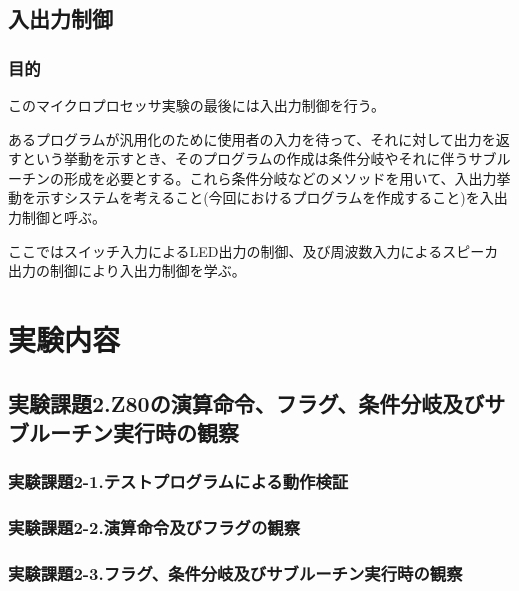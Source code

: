 \documentclass[11pt,a4j]{jsarticle}
\begin{document}
   
  \subsection{入出力制御}
   
   \subsubsection{目的}
   このマイクロプロセッサ実験の最後には入出力制御を行う。
   
   あるプログラムが汎用化のために使用者の入力を待って、それに対して出力を返すという挙動を示すとき、そのプログラムの作成は条件分岐やそれに伴うサブルーチンの形成を必要とする。これら条件分岐などのメソッドを用いて、入出力挙動を示すシステムを考えること(今回におけるプログラムを作成すること)を入出力制御と呼ぶ。
   
   ここではスイッチ入力によるLED出力の制御、及び周波数入力によるスピーカ出力の制御により入出力制御を学ぶ。
   
   \subsubsection{}
  
  
 \section{実験内容}
  
  \subsection{実験課題2.Z80の演算命令、フラグ、条件分岐及びサブルーチン実行時の観察}
  
   \subsubsection{実験課題2-1.テストプログラムによる動作検証}
   
   
   \subsubsection{実験課題2-2.演算命令及びフラグの観察}
   
   
   \subsubsection{実験課題2-3.フラグ、条件分岐及びサブルーチン実行時の観察}
   
   
  
\end{document}
